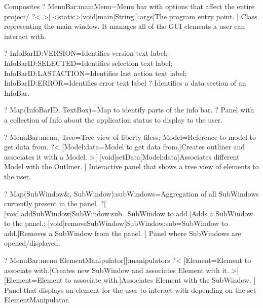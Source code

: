 \newpage
\begin{package}{Composites}
    ?
        MenuBar:mainMenu=Menu bar with options that affect the entire project/
    ?<
    >[
        \func{+}<static>[void]{main}[String[]:args]{The program entry point.}
    ]{
        Class representing the main window. It manages all of the GUI elements a user can interact with.
    }

    ?
            InfoBarID:VERSION=Identifies version text label;
            InfoBarID:SELECTED=Identifies selection text label;
            InfoBarID:LASTACTION=Identifies last action text label;
            InfoBarID:ERROR=Identifies error text label
        ?{
            Identifies a data section of an InfoBar.
        }

    ?
        Map(InfoBarID, TextBox)=Map to identify parts of the info bar.
        ?{
            Panel with a collection of Info about the application status to display to the user.
        }

    ?
            MenuBar:menu;
            Tree=Tree view of liberty filess;
            Model=Reference to model to get data from.
        ?<
            [Model:data=Model to get data from.]{Creates outliner and associates it with a Model.}
        >[
            \func{+}[void]{setData}[Model:data]{Associates different Model with the Outliner.}
        ]{
            Interactive panel that shows a tree view of elements to the user.
        }

    ?
        Map(SubWindow\&, SubWindow):subWindows=Aggregation of all SubWindows currently present in the panel.
    ?[
        \func{+}[void]{addSubWindow}[SubWindow:sub=SubWindow to add.]{Adds a SubWindow to the panel.};
        \func{+}[void]{removeSubWindow}[SubWindow:sub=SubWindow to add.]{Removes a SubWindow from the panel.}
    ]{
        Panel where SubWindows are opened/displayed.
    }

    ?
        MenuBar:menu
        ElementManipulator[]:manipulators
    ?<
        [Element=Element to associate with.]{Creates new SubWindow and associates Element with it.}
    >[
        [Element=Element to associate with.]{Associates Element with the SubWindow.}
    ]{
        Panel that displays an element for the user to interact with depending on the set ElementManipulator.
    }


\end{package}
